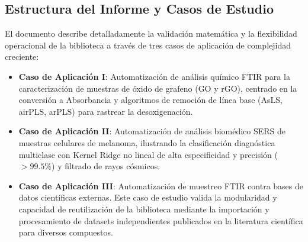 \subsection{Estructura del Informe y Casos de Estudio}
El documento describe detalladamente la validación matemática y la flexibilidad operacional de la biblioteca a través de tres casos de aplicación de complejidad creciente:
\begin{itemize}
    \item \textbf{Caso de Aplicación I}: Automatización de análisis químico FTIR para la caracterización de muestras de óxido de grafeno (GO y rGO), centrado en la conversión a Absorbancia y algoritmos de remoción de línea base (AsLS, airPLS, arPLS) para rastrear la desoxigenación.
    \item \textbf{Caso de Aplicación II}: Automatización de análisis biomédico SERS de muestras celulares de melanoma, ilustrando la clasificación diagnóstica multiclase con Kernel Ridge no lineal de alta especificidad y precisión ($>99.5\%$) y filtrado de rayos cósmicos.
    \item \textbf{Caso de Aplicación III}: Automatización de muestreo FTIR contra bases de datos científicas externas. Este caso de estudio valida la modularidad y capacidad de reutilización de la biblioteca mediante la importación y procesamiento de datasets independientes publicados en la literatura científica para diversos compuestos.
\end{itemize}

